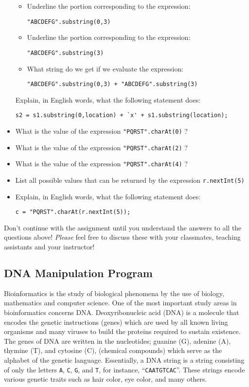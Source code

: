 \begin{itemize}
\begin{itemize}
\item
Underline the portion corresponding to the
expression:
\begin{center}
\verb$"ABCDEFG".substring(0,3)$
\end{center}
\item
Underline the portion corresponding to the
expression:
\begin{center}
\verb$"ABCDEFG".substring(3)$
\end{center}
\item
What string do we get if we evaluate the expression:
\begin{center}
\verb$"ABCDEFG".substring(0,3) + "ABCDEFG".substring(3)$
\end{center}
\end{itemize}
Explain, in English words, what the following statement does:
\begin{center}
\verb$s2 = s1.substring(0,location) + `x' + s1.substring(location);$
\end{center}
\item
What is the value of the expression \verb$"PQRST".charAt(0)$ ?
\item
What is the value of the expression \verb$"PQRST".charAt(2)$ ?
\item
What is the value of the expression \verb$"PQRST".charAt(4)$ ?
\item
List all possible values that can be returned by the expression
\verb$r.nextInt(5)$
\item
Explain, in English words, what the following statement does:
\begin{center}
\verb$c = "PQRST".charAt(r.nextInt(5));$
\end{center}
\end{itemize}
Don't continue with the assignment until you understand the answers to all the
questions above! {\em Please} feel free to discuss these with your
classmates, teaching assistants and your instructor! 

\vspace{-0.05in}
\subsection*{DNA Manipulation Program}
\vspace{-0.05in}
Bioinformatics is the study of biological phenomena by the use of biology, mathematics and computer science. One of the most important study areas in bioinformatics concerns DNA. Deoxyribonucleic acid (DNA) is a molecule that encodes the genetic instructions (genes) which are used by all known living organisms and many viruses to build the proteins required to sustain existence. The genes of DNA are written in the nucleotides; guanine (G), adenine (A), thymine (T), and cytosine (C), (chemical compounds) which serve as the alphabet of the genetic language.
Essentially, a DNA string is a string consisting of only the letters {\tt A}, {\tt C}, {\tt G}, and {\tt T}, for instance, ``{\tt CAATGTCAC}''. These strings encode
various genetic traits such as hair color, eye color, and many others.

